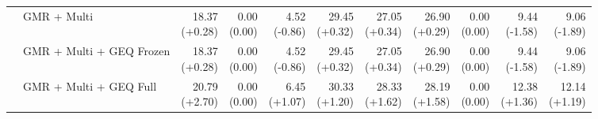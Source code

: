 \documentclass{article}
\begin{document}
{\begin{tabular}{llrrrrrrrrr}
 & GMR + Multi & \shortstack{18.37 \\ {\scriptsize\textcolor{Gain}{(+0.28)}}} & \shortstack{0.00 \\ {\scriptsize\textcolor{Zero}{(0.00)}}} & \shortstack{4.52 \\ {\scriptsize\textcolor{Loss}{(-0.86)}}} & \shortstack{29.45 \\ {\scriptsize\textcolor{Gain}{(+0.32)}}} & \shortstack{27.05 \\ {\scriptsize\textcolor{Gain}{(+0.34)}}} & \shortstack{26.90 \\ {\scriptsize\textcolor{Gain}{(+0.29)}}} & \shortstack{0.00 \\ {\scriptsize\textcolor{Zero}{(0.00)}}} & \shortstack{9.44 \\ {\scriptsize\textcolor{Loss}{(-1.58)}}} & \shortstack{9.06 \\ {\scriptsize\textcolor{Loss}{(-1.89)}}} \\
 & GMR + Multi + GEQ Frozen & \shortstack{18.37 \\ {\scriptsize\textcolor{Gain}{(+0.28)}}} & \shortstack{0.00 \\ {\scriptsize\textcolor{Zero}{(0.00)}}} & \shortstack{4.52 \\ {\scriptsize\textcolor{Loss}{(-0.86)}}} & \shortstack{29.45 \\ {\scriptsize\textcolor{Gain}{(+0.32)}}} & \shortstack{27.05 \\ {\scriptsize\textcolor{Gain}{(+0.34)}}} & \shortstack{26.90 \\ {\scriptsize\textcolor{Gain}{(+0.29)}}} & \shortstack{0.00 \\ {\scriptsize\textcolor{Zero}{(0.00)}}} & \shortstack{9.44 \\ {\scriptsize\textcolor{Loss}{(-1.58)}}} & \shortstack{9.06 \\ {\scriptsize\textcolor{Loss}{(-1.89)}}} \\
 & GMR + Multi + GEQ Full & \shortstack{20.79 \\ {\scriptsize\textcolor{Gain}{(+2.70)}}} & \shortstack{0.00 \\ {\scriptsize\textcolor{Zero}{(0.00)}}} & \shortstack{6.45 \\ {\scriptsize\textcolor{Gain}{(+1.07)}}} & \shortstack{30.33 \\ {\scriptsize\textcolor{Gain}{(+1.20)}}} & \shortstack{28.33 \\ {\scriptsize\textcolor{Gain}{(+1.62)}}} & \shortstack{28.19 \\ {\scriptsize\textcolor{Gain}{(+1.58)}}} & \shortstack{0.00 \\ {\scriptsize\textcolor{Zero}{(0.00)}}} & \shortstack{12.38 \\ {\scriptsize\textcolor{Gain}{(+1.36)}}} & \shortstack{12.14 \\ {\scriptsize\textcolor{Gain}{(+1.19)}}} \\
\bottomrule\end{tabular}}\par
\end{document}
